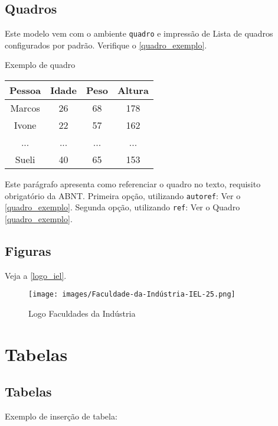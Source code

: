 \section{Quadros}

Este modelo vem com o ambiente \texttt{quadro} e impressão de Lista de quadros 
configurados por padrão. Verifique o \autoref{quadro_exemplo}.

\begin{quadro}[htb]
\caption{\label{quadro_exemplo}Exemplo de quadro}
\begin{tabular}{|c|c|c|c|}
	\hline
	\textbf{Pessoa} & \textbf{Idade} & \textbf{Peso} & \textbf{Altura} \\ \hline
	Marcos & 26    & 68   & 178    \\ \hline
	Ivone  & 22    & 57   & 162    \\ \hline
	...    & ...   & ...  & ...    \\ \hline
	Sueli  & 40    & 65   & 153    \\ \hline
\end{tabular}
\end{quadro}

Este parágrafo apresenta como referenciar o quadro no texto, requisito
obrigatório da ABNT. 
Primeira opção, utilizando \texttt{autoref}: Ver o \autoref{quadro_exemplo}. 
Segunda opção, utilizando  \texttt{ref}: Ver o Quadro \ref{quadro_exemplo}.

\section{Figuras}

Veja a \autoref{logo_iel}.

\begin{figure}[!htb]
	\centering
	\caption{\label{logo_iel}Logo Faculdades da Indústria}
	\texttt{[image: images/Faculdade-da-Indústria-IEL-25.png]}
\end{figure}

\chapter{Tabelas}

\section{Tabelas}

Exemplo de inserção de tabela:

